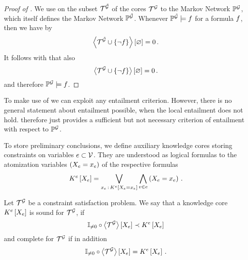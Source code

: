 \begin{proof}[Proof of ]
    We use  on the subset $\mathcal{T}^{\tilde{\mathcal{G}}}$ of the cores $\mathcal{T}^{\mathcal{G}}$ to the Markov Network $\mathbb{P}^{\mathcal{G}}$, which itself defines the Markov Network $\mathbb{P}^{\tilde{\mathcal{G}}}$.
    Whenever $\mathbb{P}^{\tilde{\mathcal{G}}}\models f$ for a formula $f$, then we have by 
    \begin{align*}
        \left\langle \mathcal{T}^{\tilde{\mathcal{G}}} \cup\{\lnot f\}\right\rangle \left[ \varnothing \right] = 0 \, .
    \end{align*}
    It follows with  that also
    \begin{align*}
        \left\langle \mathcal{T}^{\mathcal{G}} \cup\{\lnot f\}\right\rangle \left[ \varnothing \right] = 0 \, .
    \end{align*}
    and therefore $\mathbb{P}^{\mathcal{G}}\models f$.
\end{proof}


\begin{remark}
    To make use of  we can exploit any entailment criterion.
    However, there is no general statement about entailment possible, when the local entailment does not hold.
     therefore just provides a sufficient but not necessary criterion of entailment with respect to $\mathbb{P}^{\mathcal{G}}$.
\end{remark}


To store preliminary conclusions, we define auxiliary knowledge cores storing constraints on variables $e\subset\mathcal{V}$.
They are understood as logical formulas to the atomization variables $\left(X_{e}=x_{e}\right)$ of the respective formulas
\begin{align*}
    K^{e}\left[X_{e}\right]
    = \bigvee_{x_{e} \, : \, K^{e}\left[X_{e}=x_{e}\right]} \bigwedge_{v\in e} \left(X_{e}=x_{e}\right) \, .
\end{align*}

\begin{definition}
    Let $\mathcal{T}^{\mathcal{G}}$ be a constraint satisfaction problem. %
    We say that a knowledge core $K^{e}\left[X_{e}\right]$ is sound for $\mathcal{T}^{\mathcal{G}}$, if
    \begin{align*}
        \mathbb{I}_{\neq0}\circ\left\langle \mathcal{T}^{\mathcal{G}}\right\rangle \left[ X_{e} \right]  \prec K^{e}\left[X_{e}\right]
    \end{align*}
    and complete for $\mathcal{T}^{\mathcal{G}}$ if in addition
    \begin{align*}
        \mathbb{I}_{\neq0}\circ\left\langle \mathcal{T}^{\mathcal{G}}\right\rangle \left[ X_{e} \right]=K^{e}\left[X_{e}\right] \, .
    \end{align*}
\end{definition}



